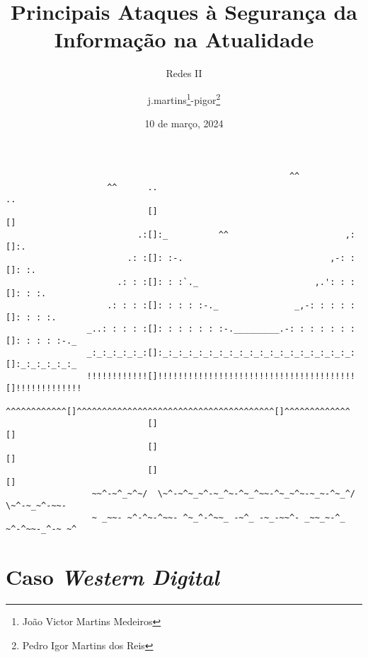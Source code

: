 \documentclass[bookmarks=false,aspectratio=169,9pt]{beamer}
\date{10 de março, 2024}
\title[Seminário - Redes II]{Principais Ataques à Segurança da Informação na Atualidade}
\institute[Pontifícia Universidade Católica de Minas Gerais]{@pucminas}
\author{j.martins\footnote{João Victor Martins Medeiros}-pigor\footnote{Pedro Igor Martins dos Reis}}
\subtitle{Redes II}
\begin{document}
\begin{frame}[fragile]
	\begin{verbatim}
                                                        ^^
                    ^^      ..                                       ..
                            []                                       []
                          .:[]:_          ^^                       ,:[]:.
                        .: :[]: :-.                             ,-: :[]: :.
                      .: : :[]: : :`._                       ,.': : :[]: : :.
                    .: : : :[]: : : : :-._               _,-: : : : :[]: : : :.
                _..: : : : :[]: : : : : : :-._________.-: : : : : : :[]: : : : :-._
                _:_:_:_:_:_:[]:_:_:_:_:_:_:_:_:_:_:_:_:_:_:_:_:_:_:_:[]:_:_:_:_:_:_
                !!!!!!!!!!!![]!!!!!!!!!!!!!!!!!!!!!!!!!!!!!!!!!!!!!!![]!!!!!!!!!!!!!
                ^^^^^^^^^^^^[]^^^^^^^^^^^^^^^^^^^^^^^^^^^^^^^^^^^^^^^[]^^^^^^^^^^^^^
                            []                                       []
                            []                                       []
                            []                                       []
                 ~~^-~^_~^~/  \~^-~^~_~^-~_^~-^~_^~~-^~_~^~-~_~-^~_^/  \~^-~_~^-~~-
                 ~ _~~- ~^-^~-^~~- ^~_^-^~~_ -~^_ -~_-~~^- _~~_~-^_ ~^-^~~-_^-~ ~^
\end{verbatim}
\end{frame}
\begin{frame}
	\titlepage
\end{frame}
\section{Caso \textit{Western Digital}}
\end{document}
